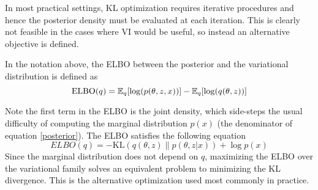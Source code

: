 In most practical settings, KL optimization requires iterative procedures and hence the posterior density must be evaluated at each iteration. This is clearly not feasible in the cases where VI would be useful, so instead an alternative objective is defined. 
\begin{definition}
	In the notation above, the ELBO between the posterior and the variational distribution is defined as
	\begin{equation*}
	\text{ELBO}(q) = \mathbb{E}_{q}[\log(p(\theta, z, x))] - \mathbb{E}_{q}[\log(q(\theta, z))]
	\end{equation*}
\end{definition}
Note the first term in the ELBO is the joint density, which side-steps the usual difficulty of computing the marginal distribution $p(x)$ (the denominator of equation \ref{posterior}). The ELBO satisfies the following equation
\begin{equation}
ELBO(q) = - \text{KL}(q(\theta, z) \| p(\theta, z |x)) + \log p(x)
\end{equation}
Since the marginal distribution does not depend on $q$, maximizing the ELBO over the variational family solves an equivalent problem to minimizing the KL divergence. This is the alternative optimization used most commonly in practice. 
